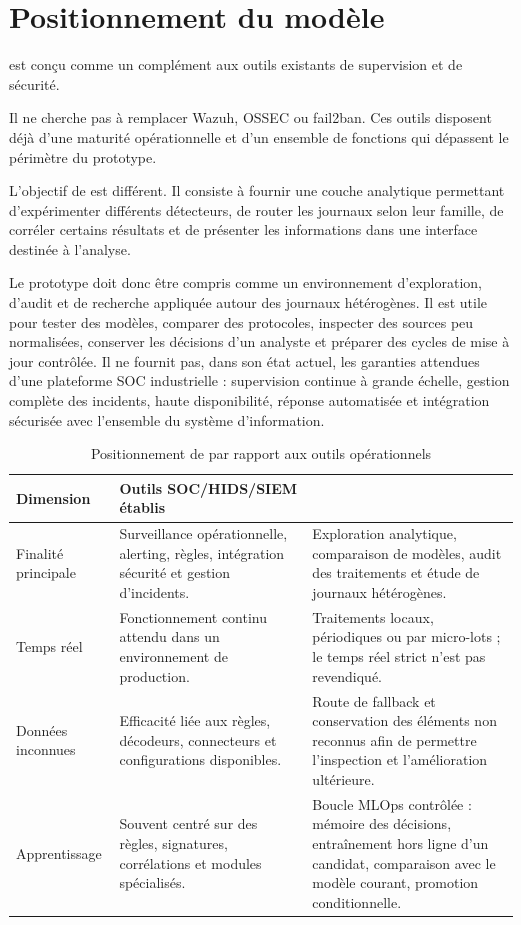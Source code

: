 \section{Positionnement du modèle}

\logminer{} est conçu comme un complément aux outils existants de supervision et de sécurité.

Il ne cherche pas à remplacer Wazuh, OSSEC ou fail2ban. Ces outils disposent déjà d'une maturité opérationnelle et d'un ensemble de fonctions qui dépassent le périmètre du prototype.

L'objectif de \logminer{} est différent. Il consiste à fournir une couche analytique permettant d'expérimenter différents détecteurs, de router les journaux selon leur famille, de corréler certains résultats et de présenter les informations dans une interface destinée à l'analyse.

Le prototype doit donc être compris comme un environnement d'exploration, d'audit et de recherche appliquée autour des journaux hétérogènes. Il est utile pour tester des modèles, comparer des protocoles, inspecter des sources peu normalisées, conserver les décisions d'un analyste et préparer des cycles de mise à jour contrôlée. Il ne fournit pas, dans son état actuel, les garanties attendues d'une plateforme SOC industrielle : supervision continue à grande échelle, gestion complète des incidents, haute disponibilité, réponse automatisée et intégration sécurisée avec l'ensemble du système d'information.

\begin{table}[H]
\centering
\caption{Positionnement de \logminer{} par rapport aux outils opérationnels}
\label{tab:positionnement-logminer}
\scriptsize
\begin{tabularx}{\textwidth}{p{3.2cm}X X}
\toprule
\textbf{Dimension} &
\textbf{Outils SOC/HIDS/SIEM établis} &
\textbf{\logminer{}}
\tabularnewline
\midrule
Finalité principale &
Surveillance opérationnelle, alerting, règles, intégration sécurité et gestion d'incidents. &
Exploration analytique, comparaison de modèles, audit des traitements et étude de journaux hétérogènes.
\tabularnewline
Temps réel &
Fonctionnement continu attendu dans un environnement de production. &
Traitements locaux, périodiques ou par micro-lots ; le temps réel strict n'est pas revendiqué.
\tabularnewline
Données inconnues &
Efficacité liée aux règles, décodeurs, connecteurs et configurations disponibles. &
Route de fallback et conservation des éléments non reconnus afin de permettre l'inspection et l'amélioration ultérieure.
\tabularnewline
Apprentissage &
Souvent centré sur des règles, signatures, corrélations et modules spécialisés. &
Boucle MLOps contrôlée : mémoire des décisions, entraînement hors ligne d'un candidat, comparaison avec le modèle courant, promotion conditionnelle.
\tabularnewline
\bottomrule
\end{tabularx}
\end{table}

